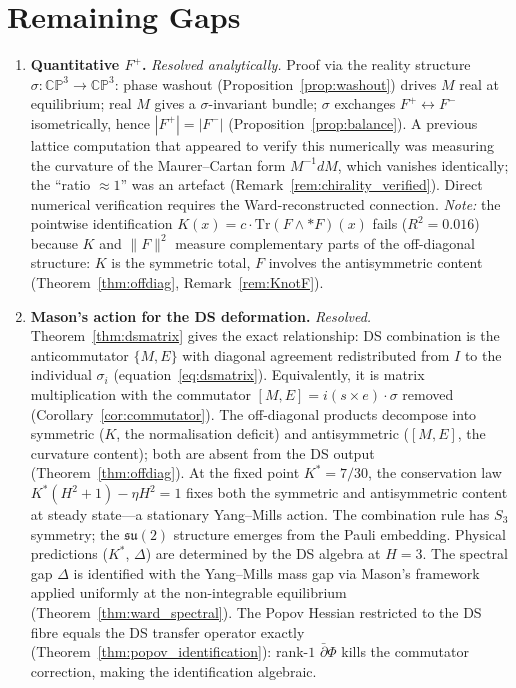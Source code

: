 \documentclass[11pt,a4paper]{article}
\theoremstyle{definition}
\theoremstyle{remark}
\newcommand{\CP}{\mathbb{CP}}
\newcommand{\dbar}{\bar{\partial}}
\newcommand{\Tr}{\mathrm{Tr}}
\newcommand{\su}{\mathfrak{su}}
\begin{document}
\section{Remaining Gaps}\label{sec:gaps}

\begin{enumerate}[nosep]
\item \textbf{Quantitative $F^+$.} \emph{Resolved analytically.} Proof via the reality structure $\sigma:\CP^3\to\CP^3$: phase washout (Proposition~\ref{prop:washout}) drives $M$ real at equilibrium; real $M$ gives a $\sigma$-invariant bundle; $\sigma$ exchanges $F^+\leftrightarrow F^-$ isometrically, hence $|F^+|=|F^-|$ (Proposition~\ref{prop:balance}). A previous lattice computation that appeared to verify this numerically was measuring the curvature of the Maurer--Cartan form $M^{-1}dM$, which vanishes identically; the ``ratio $\approx 1$'' was an artefact (Remark~\ref{rem:chirality_verified}). Direct numerical verification requires the Ward-reconstructed connection. \emph{Note:} the pointwise identification $K(x)=c\cdot\Tr(F\wedge{*}F)(x)$ fails ($R^2=0.016$) because $K$ and $\|F\|^2$ measure complementary parts of the off-diagonal structure: $K$ is the symmetric total, $F$ involves the antisymmetric content (Theorem~\ref{thm:offdiag}, Remark~\ref{rem:KnotF}).
\item \textbf{Mason's action for the DS deformation.} \emph{Resolved.} Theorem~\ref{thm:dsmatrix} gives the exact relationship: DS combination is the anticommutator $\{M,E\}$ with diagonal agreement redistributed from $I$ to the individual $\sigma_i$ (equation~\ref{eq:dsmatrix}). Equivalently, it is matrix multiplication with the commutator $[M,E]=i(s\times e)\cdot\sigma$ removed (Corollary~\ref{cor:commutator}). The off-diagonal products decompose into symmetric ($K$, the normalisation deficit) and antisymmetric ($[M,E]$, the curvature content); both are absent from the DS output (Theorem~\ref{thm:offdiag}). At the fixed point $K^*=7/30$, the conservation law $K^*(H^2+1)-\eta H^2=1$ fixes both the symmetric and antisymmetric content at steady state---a stationary Yang--Mills action. The combination rule has $S_3$ symmetry; the $\su(2)$ structure emerges from the Pauli embedding. Physical predictions ($K^*$, $\Delta$) are determined by the DS algebra at $H=3$. The spectral gap $\Delta$ is identified with the Yang--Mills mass gap via Mason's framework applied uniformly at the non-integrable equilibrium (Theorem~\ref{thm:ward_spectral}). The Popov Hessian restricted to the DS fibre equals the DS transfer operator exactly (Theorem~\ref{thm:popov_identification}): rank-$1$ $\dbar\Phi$ kills the commutator correction, making the identification algebraic.

\end{enumerate}
\end{document}
